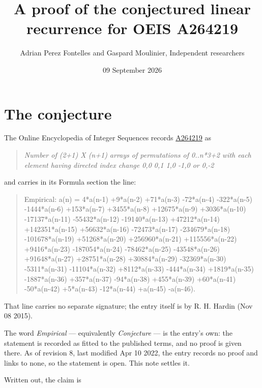 \documentclass[11pt]{article}
\title{A proof of the conjectured linear recurrence for OEIS A264219}
\author{Adrian Perez Fontelles and Gaspard Moulinier, Independent researchers}
\date{09 September 2026}
\theoremstyle{definition}
\begin{document}
\maketitle
\section{The conjecture}

The Online Encyclopedia of Integer Sequences records \href{https://oeis.org/A264219}{A264219} as

\begin{quote}\itshape Number of (2+1) X (n+1) arrays of permutations of 0..n*3+2 with each element having directed index change 0,0 0,1 1,0 -1,0 or 0,-2\end{quote}

and carries in its Formula section the line:

\begin{quote}\ttfamily Empirical: a(n) = 4*a(n-1) +9*a(n-2) +71*a(n-3) -72*a(n-4) -322*a(n-5) -1444*a(n-6) +153*a(n-7) +3455*a(n-8) +12675*a(n-9) +3036*a(n-10) -17137*a(n-11) -55432*a(n-12) -19140*a(n-13) +47212*a(n-14) +142351*a(n-15) +56632*a(n-16) -72473*a(n-17) -234679*a(n-18) -101678*a(n-19) +51268*a(n-20) +256960*a(n-21) +115556*a(n-22) +9416*a(n-23) -187054*a(n-24) -78462*a(n-25) -43548*a(n-26) +91648*a(n-27) +28751*a(n-28) +30884*a(n-29) -32369*a(n-30) -5311*a(n-31) -11104*a(n-32) +8112*a(n-33) -444*a(n-34) +1819*a(n-35) -1887*a(n-36) +357*a(n-37) -94*a(n-38) +455*a(n-39) +60*a(n-41) -50*a(n-42) +5*a(n-43) -12*a(n-44) +a(n-45) -a(n-46).\end{quote}

That line carries no separate signature; the entry itself is by R. H. Hardin (Nov 08 2015).

The word {\itshape Empirical} --- equivalently {\itshape Conjecture} --- is the entry's own: the statement is recorded as fitted to the published terms, and no proof is given there. As of revision 8, last modified Apr 10 2022, the entry records no proof and links to none, so the statement is open. This note settles it.

Written out, the claim is
\end{document}
